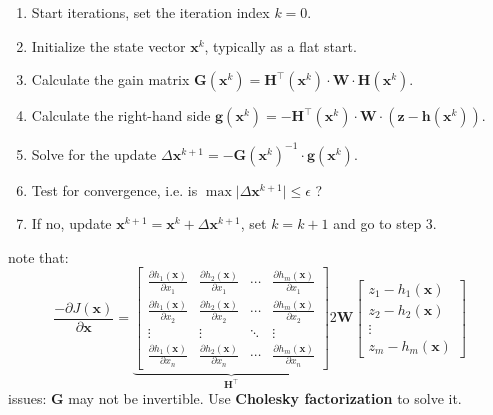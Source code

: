 \documentclass[a4paper,10pt,landscape]{scrartcl}
\begin{document}
\begin{multicols*}{3}
\begin{enumerate}
    \item Start iterations, set the iteration index $k = 0$.
    \item Initialize the state vector $\mathbf{x}^k$, typically as a flat start.
    \item Calculate the gain matrix $\mathbf{G}(\mathbf{x}^k) = \mathbf{H}^\top(\mathbf{x}^k) \cdot \mathbf{W} \cdot \mathbf{H}(\mathbf{x}^k)$.
    \item Calculate the right-hand side $\mathbf{g}(\mathbf{x}^k) = -\mathbf{H}^\top(\mathbf{x}^k) \cdot \mathbf{W} \cdot 
    \left( \mathbf{z} - \mathbf{h}(\mathbf{x}^k) \right)$.
    \item Solve for the update $\Delta \mathbf{x}^{k+1} = -\mathbf{G}(\mathbf{x}^k)^{-1} \cdot \mathbf{g}(\mathbf{x}^k)$.
    \item Test for convergence, i.e. is $\max \lvert \Delta \mathbf{x}^{k+1} \rvert \leq \epsilon$ ?
    \item If no, update $\mathbf{x}^{k+1} = \mathbf{x}^k + \Delta \mathbf{x}^{k+1}$, set $k = k + 1$ and go to step 3.
\end{enumerate}
note that:
\[
\frac{-\partial J(\mathbf{x})}{\partial \mathbf{x}} = \underbrace{\begin{bmatrix}
    \frac{\partial h_1(\mathbf{x})}{\partial x_1} & \frac{\partial h_2(\mathbf{x})}{\partial x_1} & \cdots & \frac{\partial h_m(\mathbf{x})}{\partial x_1} \\
    \frac{\partial h_1(\mathbf{x})}{\partial x_2} & \frac{\partial h_2(\mathbf{x})}{\partial x_2} & \cdots & \frac{\partial h_m(\mathbf{x})}{\partial x_2} \\
    \vdots & \vdots & \ddots & \vdots \\
    \frac{\partial h_1(\mathbf{x})}{\partial x_n} & \frac{\partial h_2(\mathbf{x})}{\partial x_n} & \cdots & \frac{\partial h_m(\mathbf{x})}{\partial x_n}
\end{bmatrix}}_{\mathbf{H}^\top} 
2\mathbf{W}
\begin{bmatrix}
    z_1 - h_1(\mathbf{x}) \\
    z_2 - h_2(\mathbf{x}) \\
    \vdots \\
    z_m - h_m(\mathbf{x})
\end{bmatrix}
\]
issues: $\mathbf{G}$ may not be invertible. Use \textbf{Cholesky factorization} to solve it.


\end{multicols*}
\end{document}

